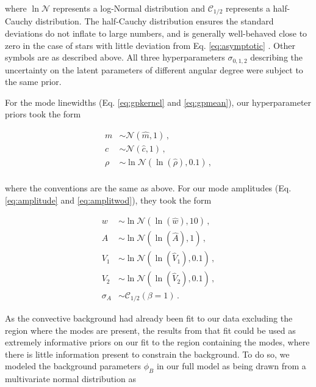 \documentclass[12pt]{article}
\begin{document}
\noindent where $\ln\mathcal{N}$ represents a log-Normal distribution and $\mathcal{C}_{1/2}$ represents a half-Cauchy distribution. The half-Cauchy distribution ensures the standard deviations do not inflate to large numbers, and is generally well-behaved close to zero in the case of stars with little deviation from Eq. \ref{eq:asymptotic} \cite{gelman2006}. Other symbols are as described above. All three hyperparameters $\sigma_{0,1,2}$ describing the uncertainty on the latent parameters of different angular degree were subject to the same prior.

For the mode linewidths (Eq. \ref{eq:gpkernel} and \ref{eq:gpmean}), our hyperparameter priors took the form

\begin{equation}
	\begin{split}
		m &\sim \mathcal{N}(\hat{m}, 1)\, ,\\
		c &\sim \mathcal{N}(\hat{c}, 1)\, ,\\
		\rho &\sim \ln\mathcal{N}(\ln(\hat{\rho}), 0.1)\, ,\\
	\end{split}
\end{equation}

\noindent where the conventions are the same as above. For our mode amplitudes (Eq. \ref{eq:amplitude} and \ref{eq:amplitwod}), they took the form

\begin{equation}
	\begin{split}
		w &\sim \ln\mathcal{N}(\ln(\hat{w}), 10)\, ,\\
		A &\sim \ln\mathcal{N}(\ln(\hat{A}), 1)\, ,\\
		V_1 &\sim \ln\mathcal{N}(\ln(\hat{V}_1), 0.1)\, ,\\
		V_2 &\sim \ln\mathcal{N}(\ln(\hat{V}_2), 0.1)\, ,\\
		\sigma_A &\sim \mathcal{C}_{1/2}(\beta = 1)\, .
	\end{split}
\end{equation}

As the convective background had already been fit to our data excluding the region where the modes are present, the results from that fit could be used as extremely informative priors on our fit to the region containing the modes, where there is little information present to constrain the background. To do so, we modeled the background parameters $\phi_B$ in our full model as being drawn from a multivariate normal distribution as
\end{document}
